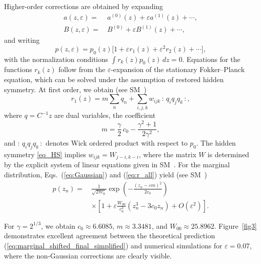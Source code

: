 \documentclass[aps,twocolumn,superscriptaddress]{revtex4-2}
\begin{document}
Higher-order corrections are obtained by expanding
\begin{equation}
\begin{aligned}
a(z,\varepsilon)=\, & a^{(0)}(z)+\varepsilon a^{(1)}(z)+\cdots,\\
B(z,\varepsilon)=\, & B^{(0)}+\varepsilon B^{(1)}(z)+\cdots,
\end{aligned}
\end{equation}
and writing
\begin{equation}
p(z,\varepsilon)=p_0(z)\bigl[1+\varepsilon r_1(z)+\varepsilon^2 r_2(z)+\cdots\bigr],
\label{eq_p_expansion}
\end{equation}
with the normalization conditions $\int r_k(z)p_0(z)\,dz=0$. Equations for the functions $r_k(z)$ follow from the $\varepsilon$-expansion of the stationary Fokker--Planck equation, which can be solved under the assumption of restored hidden symmetry. At first order, we obtain (see SM~\cite[\S III]{SM})
\begin{equation}
r_1(z)=m\sum_n q_n+\sum_{i,j,k} w_{ijk}\, {:}\,q_iq_jq_k\,{:},
\label{eq:r_all}
\end{equation}
where $q=C^{-1}z$ are dual variables, the coefficient
\begin{equation}
m=\frac{\gamma}{2}\,c_0-\frac{\gamma^2+1}{2\gamma^2},
\label{eq:m_final}
\end{equation}
and ${:}\,q_iq_jq_k\,{:}$ denotes Wick ordered product with respect to $p_0$.
The hidden symmetry \eqref{eq_HS} implies $w_{ijk}=W_{j-i,k-i}$, where the matrix $W$ is determined by the explicit system of linear equations given in SM~\cite[\S IIIA]{SM}.
For the marginal distribution, Eqs.~(\ref{eq:Gaussian}) and (\ref{eq:r_all}) yield (see SM~\cite[\S IV]{SM})
\begin{equation}
\begin{aligned}
p(z_n) =\, &
\frac{1}{\sqrt{2\pi c_0}}
\exp\!\left(-\frac{(z_n-\varepsilon m)^2}{2c_0}\right)
\\
& \times\left[
1+\varepsilon \frac{W_{00}}{c_0^3}
\left(z_n^3-3c_0 z_n\right)
+O(\varepsilon^2)
\right].
\end{aligned}
\label{eq:marginal_shifted_final_simplified}
\end{equation}

For \(\gamma=2^{1/3}\), we obtain \(c_0\approx 6.6085\), \(m\approx 3.3481\), and \(W_{00}\approx 25.8962\). Figure~\ref{fig3} demonstrates excellent agreement between the theoretical prediction (\ref{eq:marginal_shifted_final_simplified}) and numerical simulations for \(\varepsilon=0.07\), where the non-Gaussian corrections are clearly visible.
\end{document}
